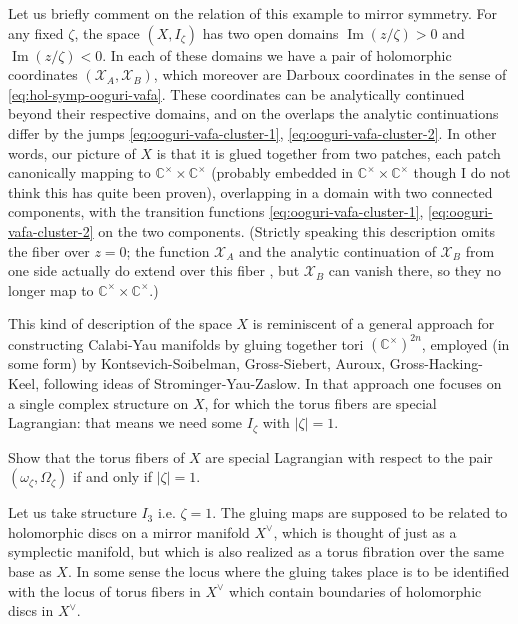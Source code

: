 \documentclass[12pt,letterpaper,reqno]{article}
\numberwithin{equation}{section}
\newcommand{\cX}{\ensuremath{\mathcal X}}
\newcommand{\C}{\ensuremath{\mathbb C}}
\newcommand{\abs}[1]{\lvert#1\rvert}
\DeclareMathOperator{\im}{Im}
\newcommand{\fixme}[1]{{\color{orange}{[#1]}}}
\begin{document}
Let us briefly comment on the relation of this example to mirror symmetry.
For any fixed $\zeta$, the space $(X,I_\zeta)$
has two open domains $\im(z / \zeta) > 0$ and $\im(z / \zeta) < 0$.
In each of these domains
we have a pair of holomorphic coordinates $(\cX_A, \cX_B)$, which moreover
are Darboux coordinates in the sense of \eqref{eq:hol-symp-ooguri-vafa}.
These coordinates can be analytically continued beyond their respective
domains, and on the overlaps the analytic continuations differ by the
jumps \eqref{eq:ooguri-vafa-cluster-1}, \eqref{eq:ooguri-vafa-cluster-2}.
In other words, our picture of $X$ is that it is glued together from
two patches, each patch
canonically mapping to $\C^\times \times \C^\times$
(probably embedded in $\C^\times \times \C^\times$ though I do not
think this has quite been proven),
overlapping in a domain with two connected components,
with the transition functions
\eqref{eq:ooguri-vafa-cluster-1}, \eqref{eq:ooguri-vafa-cluster-2}
on the two components.
(Strictly speaking this description omits the fiber over $z = 0$;
the function $\cX_A$ and the analytic continuation of $\cX_B$ from one side
actually do extend over this fiber \fixme{check}, 
but $\cX_B$ can vanish there, so they no longer map
to $\C^\times \times \C^\times$.)

This kind of description of the space $X$ is reminiscent of a general
approach for constructing Calabi-Yau manifolds by gluing
together tori $(\C^\times)^{2n}$, employed (in some form) by
Kontsevich-Soibelman, Gross-Siebert, Auroux, Gross-Hacking-Keel, following
ideas of Strominger-Yau-Zaslow.
In that approach one focuses on a single complex structure on $X$,
for which  the torus fibers are special Lagrangian: that means
we need some $I_\zeta$ with $\abs{\zeta} = 1$.

\begin{exercise} Show that the torus fibers of $X$ are special
Lagrangian with respect to the pair $(\omega_\zeta, \Omega_\zeta)$
if and only if $\abs{\zeta} = 1$.
\end{exercise}

Let us take structure $I_3$ i.e.
$\zeta = 1$. The gluing maps are supposed to be related to
holomorphic discs on a mirror manifold $X^\vee$, which is thought of
just as a symplectic manifold, but which is also
realized as a torus fibration over the same base as $X$. In some sense
the locus where the gluing takes place is to be identified with the
locus of torus fibers in $X^\vee$
which contain boundaries of holomorphic
discs in $X^\vee$.
\end{document}
